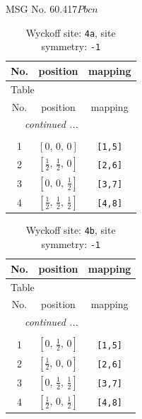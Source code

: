 \documentclass[fleqn,8pt]{jsarticle}
\begin{document}
\setcounter{MaxMatrixCols}{32}

\renewcommand{\tablename}{Table~}
\renewcommand{\figurename}{Figure~}
\begin{center}
\LARGE
MSG No. 60.417\quad$Pbcn$
\end{center}
\renewcommand{\arraystretch}{1.2}
\begin{longtable}{ccc}
\caption{Wyckoff site: {\tt 4a}, site symmetry: {\tt -1}}
 \\
 \hline \hline
No. & position & mapping \\ \hline \endfirsthead

\multicolumn{2}{l}{\tablename\ \thetable{}} \\
 \hline \hline
No. & position & mapping \\ \hline \endhead

 \hline \hline
\multicolumn{2}{r}{\footnotesize\it continued ...} \\ \endfoot

 \hline \hline
\multicolumn{2}{r}{} \\ \endlastfoot

1 & $\left[ 0,\, 0,\, 0 \right]$ & {\tt [1,5]} \\ \hline
2 & $\left[ \frac{1}{2},\, \frac{1}{2},\, 0 \right]$ & {\tt [2,6]} \\ \hline
3 & $\left[ 0,\, 0,\, \frac{1}{2} \right]$ & {\tt [3,7]} \\ \hline
4 & $\left[ \frac{1}{2},\, \frac{1}{2},\, \frac{1}{2} \right]$ & {\tt [4,8]} \\
\end{longtable}
\renewcommand{\arraystretch}{1.2}
\begin{longtable}{ccc}
\caption{Wyckoff site: {\tt 4b}, site symmetry: {\tt -1}}
 \\
 \hline \hline
No. & position & mapping \\ \hline \endfirsthead

\multicolumn{2}{l}{\tablename\ \thetable{}} \\
 \hline \hline
No. & position & mapping \\ \hline \endhead

 \hline \hline
\multicolumn{2}{r}{\footnotesize\it continued ...} \\ \endfoot

 \hline \hline
\multicolumn{2}{r}{} \\ \endlastfoot

1 & $\left[ 0,\, \frac{1}{2},\, 0 \right]$ & {\tt [1,5]} \\ \hline
2 & $\left[ \frac{1}{2},\, 0,\, 0 \right]$ & {\tt [2,6]} \\ \hline
3 & $\left[ 0,\, \frac{1}{2},\, \frac{1}{2} \right]$ & {\tt [3,7]} \\ \hline
4 & $\left[ \frac{1}{2},\, 0,\, \frac{1}{2} \right]$ & {\tt [4,8]} \\
\end{longtable}
\end{document}
